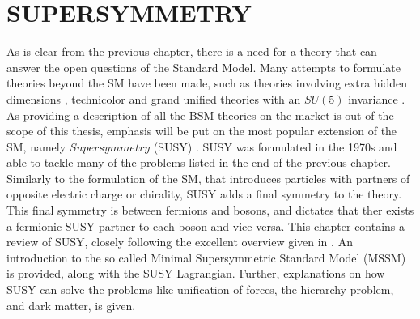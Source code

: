 \chapter{SUPERSYMMETRY} \label{susy}
\noindent\justify
As is clear from the previous chapter, there is a need for a theory that can answer the open questions of the Standard Model. 
Many attempts to formulate theories beyond the SM have been made, such as theories involving extra hidden dimensions \cite{ArkaniHamed:1998rs}, technicolor \cite{Hill:2002ap} and grand unified theories with an $SU(5)$ invariance \cite{Georgi:1974sy}.
As providing a description of all the BSM theories on the market is out of the scope of this thesis, emphasis will be put on the most popular extension of the SM, namely $Supersymmetry$ (SUSY) \cite{Wess:1973kz, Fayet:1974pd, Nilles:1983ge}. 
SUSY was formulated in the 1970s and able to tackle many of the problems listed in the end of the previous chapter. 
Similarly to the formulation of the SM, that introduces particles with partners of opposite electric charge or chirality, SUSY adds a final symmetry to the theory. 
This final symmetry is between fermions and bosons, and dictates that ther exists a fermionic SUSY partner to each boson and vice versa. 
\newpara
\noindent\justify
This chapter contains a review of SUSY, closely following the excellent overview given in \cite{Martin:1997ns}. 
An introduction to the so called Minimal Supersymmetric Standard Model (MSSM) is provided, along with the SUSY Lagrangian. 
Further, explanations on how SUSY can solve the problems like unification of forces, the hierarchy problem, and dark matter, is given.  
\newpage
